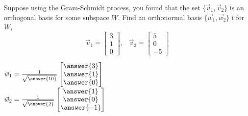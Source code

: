 \documentclass{ximera}
\begin{document}
  	  		              \begin{question} 
  	  		              Suppose using the Gram-Schmidt process, you found that the set $\{\vec{v}_1,\vec{v}_2\}$ is an orthogonal basis for some subspace $W$. Find an orthonormal basis $\{\vec{w}_1,\vec{w}_2\}$ i for $W$,
  	  		              	$$\vec{v}_1 = \begin{bmatrix} 3\\1\\0\end{bmatrix}, \hspace{10pt} \vec{v}_2 = \begin{bmatrix} 5\\0\\-5\end{bmatrix}$$
  	  		              	
  	  		              	$\vec{w}_1 = \frac{1}{\sqrt{\answer{10}}}\begin{bmatrix} \answer{3}\\\answer{1}\\\answer{0}\end{bmatrix}$\vspace{10pt}\\
  	  		              	$\vec{w}_2 = \frac{1}{\sqrt{\answer{2}}}\begin{bmatrix} \answer{1}\\\answer{0}\\\answer{-1}\end{bmatrix}$\vspace{10pt}\\
  	  		              
  	  		              \end{question}
\end{document}
